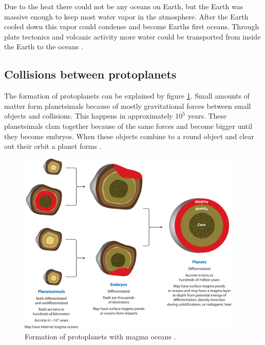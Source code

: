 Due to the heat there could not be any oceans on Earth, but the Earth was massive enough to keep most water vapor in the atmosphere. After the Earth cooled down this vapor could condense and become Earths first oceans. Through plate tectonics and volcanic activity more water could be transported from inside the Earth to the oceans \cite[p.~130-131]{TPmagma}.


\newpage
\subsection{Collisions between protoplanets}
The formation of protoplanets can be explained by figure \ref{fig:protoplanets}. Small amounts of matter form planetsimals because of mostly gravitational forces between small objects and collisions. This happens in approximately $10^5$ years. These planetsimals clam together because of the same forces and become bigger until they become embryos. When these objects combine to a round object and clear out their orbit a planet forms \cite[p.~118-120]{TPmagma} \cite{TPplanetesimals}.

\begin{figure}[H]
	\center
	\includegraphics[width=0.95\textwidth]{figures/protoplanets.png}
	\caption{\label{fig:protoplanets}Formation of protoplanets with magma oceans \cite[p.~120]{TPmagma}.}
\end{figure}

